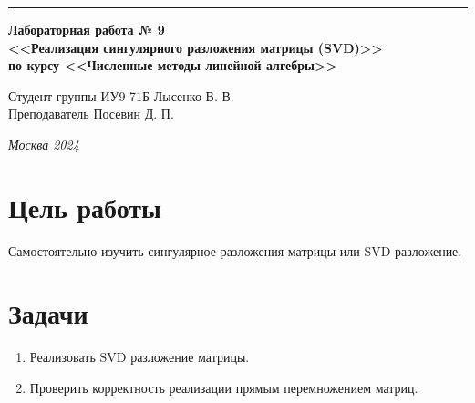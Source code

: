 \documentclass[a4paper, 14pt]{extarticle}
\begin{document}
\begin{titlepage}
\vspace*{-16pt}
\hspace{30pt}\rule{0.866\textwidth}{0.4pt}
  
\vspace{11em}

\begin{center}
\Large {\bf Лабораторная работа № 9} \\ 
\large {\bf<<Реализация сингулярного разложения матрицы (SVD)>>} \\ 
\large {\bf по курсу <<Численные методы линейной алгебры>>} \\ 
\end{center}\normalsize

\vspace{8em}


\begin{flushright}
  {Студент группы ИУ9-71Б Лысенко В. В.\hspace*{15pt} \\
  \vspace{2ex}
  Преподаватель Посевин Д. П.\hspace*{15pt}}
\end{flushright}

\bigskip

\vfill
 

\begin{center}
\textsl{Москва 2024}
\end{center}
\end{titlepage}

\renewcommand{\ttdefault}{pcr}

\setlength{\tabcolsep}{3pt}
\newpage
\setcounter{page}{2}

\section{Цель работы}\label{Sect::task}
\par
\renewcommand{\labelenumii}{\arabic{enumi}.\arabic{enumii}.}
Самостоятельно изучить сингулярное разложения матрицы или SVD разложение.

\section{Задачи}\label{Sect::task}
\par
\renewcommand{\labelenumii}{\arabic{enumi}.\arabic{enumii}.}
\begin{enumerate} 
    \item Реализовать SVD разложение матрицы.
    \item Проверить корректность реализации прямым перемножением матриц.
\end{enumerate}
\end{document}
